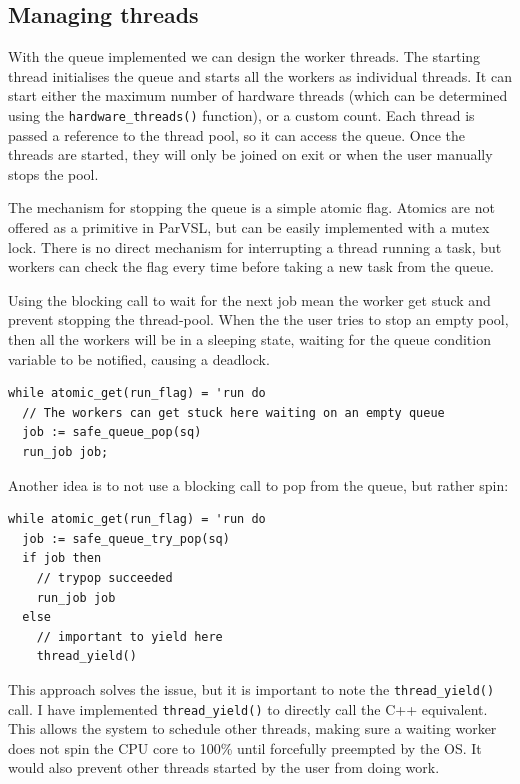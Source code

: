 \subsection{Managing threads}
\label{ssec:managethreads}

With the queue implemented we can design the worker threads. The starting thread
initialises the queue and starts all the workers as individual threads. It can start
either the maximum number of hardware threads (which can be determined using the
\texttt{hardware\_threads()} function), or a custom count. Each thread is passed a reference to
the thread pool, so it can access the queue. Once the threads are started, they will only
be joined on exit or when the user manually stops the pool.

The mechanism for stopping the queue is a simple atomic flag. Atomics are not offered as
a primitive in ParVSL, but can be easily implemented with a mutex lock. There is no direct
mechanism for interrupting a thread running a task, but workers can check the flag every time
before taking a new task from the queue.

Using the blocking call to wait for the next job mean the worker get stuck and prevent
stopping the thread-pool. When the the user tries to stop an empty pool, then all
the workers will be in a sleeping state, waiting for the queue condition variable to be
notified, causing a deadlock.

\begin{verbatim}
while atomic_get(run_flag) = 'run do
  // The workers can get stuck here waiting on an empty queue
  job := safe_queue_pop(sq)
  run_job job;
\end{verbatim}

Another idea is to not use a blocking call to pop from the queue, but rather spin:
\begin{verbatim}
while atomic_get(run_flag) = 'run do
  job := safe_queue_try_pop(sq)
  if job then
    // trypop succeeded
    run_job job
  else
    // important to yield here
    thread_yield()
\end{verbatim}

This approach solves the issue, but it is important to note the \texttt{thread\_yield()} call.
I have implemented \texttt{thread\_yield()} to directly call the C++ equivalent. This allows the
system to schedule other threads, making sure a waiting worker does not spin the CPU
core to 100\% until forcefully preempted by the OS. It would also prevent other threads
started by the user from doing work.

